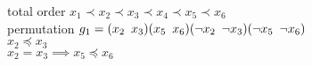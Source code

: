 
total order $ x_1 \prec x_2 \prec x_3 \prec x_4 \prec x_5 \prec x_6$\\
permutation $g_1 = (x_2 \enskip x_3)(x_5 \enskip x_6)(\neg x_2 \enskip \neg x_3)(\neg x_5 \enskip \neg x_6)$\\


$x_2 \preceq x_3$ \\
$x_2 = x_3 \implies x_5 \preceq x_6$\\

